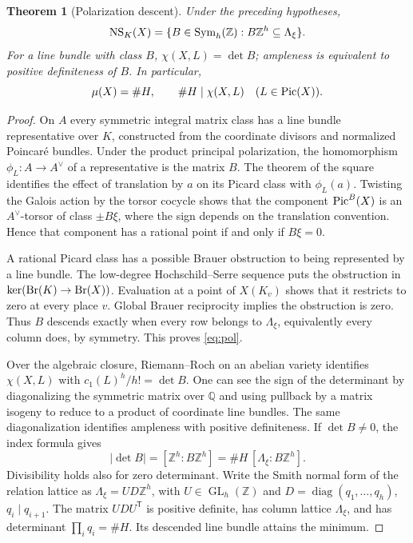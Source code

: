 \documentclass[11pt,a4paper]{article}
\newtheorem{theorem}{Theorem}[section]
\theoremstyle{definition}\newtheorem{definition}[theorem]{Definition}
\theoremstyle{remark}\newtheorem{remark}[theorem]{Remark}
\newcommand{\ZZ}{\mathbb Z}\newcommand{\QQ}{\mathbb Q}\newcommand{\FF}{\mathbb F}
\numberwithin{equation}{section}
\begin{document}
\begin{theorem}[Polarization descent]\label{thm:pol}
Under the preceding hypotheses,
\begin{equation}\label{eq:pol}
\NS_K(X)=\{B\in\Sym_h(\ZZ): B\ZZ^h\subseteq\Lambda_\xi\}.
\end{equation}
For a line bundle with class $B$, $\chi(X,L)=\det B$; ampleness is equivalent to positive definiteness of $B$. In particular,
\begin{equation}\label{eq:mu}
\mu(X)=\#H,\qquad \#H\mid\chi(X,L)\quad(L\in\operatorname{Pic}(X)).
\end{equation}
\end{theorem}
\begin{proof}
On $A$ every symmetric integral matrix class has a line bundle representative over $K$, constructed from the coordinate divisors and normalized Poincar\'{e} bundles. Under the product principal polarization, the homomorphism $\phi_L:A\to A^\vee$ of a representative is the matrix $B$. The theorem of the square identifies the effect of translation by $a$ on its Picard class with $\phi_L(a)$. Twisting the Galois action by the torsor cocycle shows that the component $\operatorname{Pic}^B(X)$ is an $A^\vee$-torsor of class $\pm B\xi$, where the sign depends on the translation convention. Hence that component has a rational point if and only if $B\xi=0$.

A rational Picard class has a possible Brauer obstruction to being represented by a line bundle. The low-degree Hochschild--Serre sequence puts the obstruction in $\ker(\operatorname{Br}(K)\to\operatorname{Br}(X))$. Evaluation at a point of $X(K_v)$ shows that it restricts to zero at every place $v$. Global Brauer reciprocity implies the obstruction is zero. Thus $B$ descends exactly when every row belongs to $\Lambda_\xi$, equivalently every column does, by symmetry. This proves \eqref{eq:pol}.

Over the algebraic closure, Riemann--Roch on an abelian variety identifies $\chi(X,L)$ with $c_1(L)^h/h!=\det B$. One can see the sign of the determinant by diagonalizing the symmetric matrix over $\QQ$ and using pullback by a matrix isogeny to reduce to a product of coordinate line bundles. The same diagonalization identifies ampleness with positive definiteness. If $\det B\ne0$, the index formula gives
\[
|\det B|=[\ZZ^h:B\ZZ^h]=\#H\,[\Lambda_\xi:B\ZZ^h].
\]
Divisibility holds also for zero determinant. Write the Smith normal form of the relation lattice as $\Lambda_\xi=UD\ZZ^h$, with $U\in\operatorname{GL}_h(\ZZ)$ and $D=\operatorname{diag}(q_1,\ldots,q_h)$, $q_i\mid q_{i+1}$. The matrix $UDU^{\mathsf T}$ is positive definite, has column lattice $\Lambda_\xi$, and has determinant $\prod_iq_i=\#H$. Its descended line bundle attains the minimum.
\end{proof}
\end{document}
